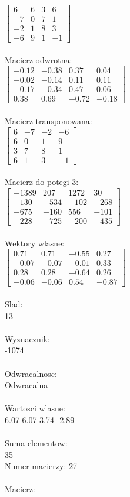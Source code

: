 \documentclass[a4paper,12pt]{article}
\begin{document}
$\begin{bmatrix} 6&6&3&6\\-7&0&7&1\\-2&1&8&3\\-6&9&1&-1 \end{bmatrix}$
\\
\\
Macierz odwrotna:\\

$\begin{bmatrix} -0.12&-0.38&0.37&0.04\\-0.02&-0.14&0.11&0.11\\-0.17&-0.34&0.47&0.06\\0.38&0.69&-0.72&-0.18 \end{bmatrix}$
\\
\\
Macierz transponowana:\\

$\begin{bmatrix} 6&-7&-2&-6\\6&0&1&9\\3&7&8&1\\6&1&3&-1 \end{bmatrix}$
\\
\\
Macierz do potegi 3:\\

$\begin{bmatrix} -1389&207&1272&30\\-130&-534&-102&-268\\-675&-160&556&-101\\-228&-725&-200&-435 \end{bmatrix}$
\\
\\
Wektory wlasne:\\

$\begin{bmatrix} 0.71&0.71&-0.55&0.27\\-0.07&-0.07&-0.01&0.33\\0.28&0.28&-0.64&0.26\\-0.06&-0.06&0.54&-0.87 \end{bmatrix}$
\\
\\
Slad:\\
13
\\
\\
Wyznacznik:\\
-1074
\\
\\
Odwracalnosc:\\
Odwracalna
\\
\\
Wartosci wlasne:\\
6.07 6.07 3.74 -2.89
\\
\\
Suma elementow:\\
35
\\
\newpage
Numer macierzy:
27
\\
\\
Macierz:\\
\end{document}
